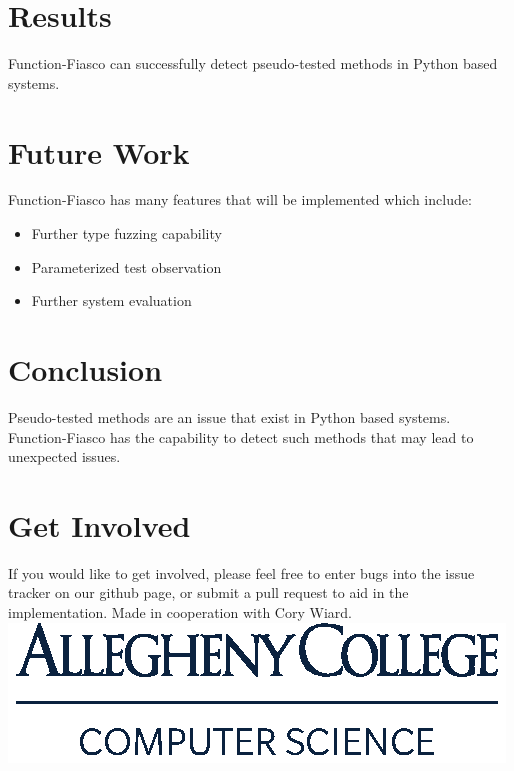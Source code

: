 \documentclass[a0paper,fleqn]{betterposter}
\begin{document}
{\section{Results}


Function-Fiasco can successfully detect pseudo-tested methods in Python based systems.

\section{Future Work}
Function-Fiasco has many features that will be implemented which include:
\begin{itemize}
  \item{Further type fuzzing capability}
  \item{Parameterized test observation}
  \item{Further system evaluation}
\end{itemize}


\section{Conclusion}
Pseudo-tested methods are an issue that exist in Python based systems. Function-Fiasco has the capability to detect such methods that may lead to unexpected issues.



\section{Get Involved}
If you would like to get involved, please feel free to enter bugs into the issue tracker on our github page, or submit a pull request to aid in the implementation.
\vfill
Made in cooperation with Cory Wiard.\\

\includegraphics[width=\textwidth]{img/ComputerScience-Stack}
}
\end{document}
